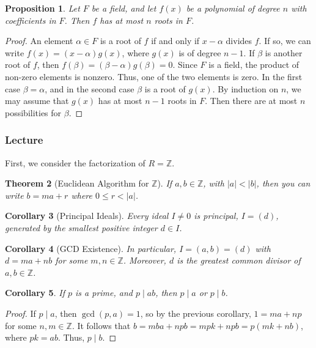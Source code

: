 \documentclass[12pt]{article}
\newtheorem{thm}{Theorem}[section]
\newtheorem{cor}[thm]{Corollary}
\newtheorem{prop}[thm]{Proposition}
\theoremstyle{definition}
\theoremstyle{remark}
\numberwithin{equation}{section}
\newcommand\Z{\mathbb Z}    %
\begin{document}
\begin{prop}
        Let $F$ be a field, and let $f(x)$ be a polynomial of degree $n$ with coefficients in $F$. Then $f$ has at most $n$ roots in $F$.
\end{prop}
\begin{proof}
        An element $\alpha \in F$ is a root of $f$ if and only if $x - \alpha$ divides $f$. If so, we can write $f(x) = (x-\alpha)g(x)$, where $g(x)$ is of degree $n-1$. If $\beta$ is another root of $f$, then $f(\beta) = (\beta - \alpha)g(\beta) = 0$. Since $F$ is a field, the product of non-zero elements is nonzero. Thus, one of the two elements is zero. In the first case $\beta = \alpha$, and in the second case $\beta$ is a root of $g(x)$. By induction on $n$, we may assume that $g(x)$ has at most $n-1$ roots in $F$. Then there are at most $n$ possibilities for $\beta$.
\end{proof}

\vspace{15pt}


\subsubsection{Lecture}

First, we consider the factorization of $R = \Z$.

\begin{thm}[Euclidean Algorithm for $\Z$]
        If $a,b \in \Z$, with $|a| < |b|$, then you can write $b =ma + r$ where $0 \leq r < |a|$.
\end{thm}


\vspace{15pt}

\begin{cor}[Principal Ideals]
        Every ideal $I \neq 0$ is principal, $I = (d)$, generated by the smallest positive integer $d \in I$.
\end{cor}

\vspace{15pt}

\begin{cor}[GCD Existence]
        In particular, $I = (a,b) = (d)$ with $d = ma + nb$ for some $m,n \in \Z$. Moreover, $d$ is the greatest common divisor of $a,b \in \Z$.
\end{cor}

\vspace{15pt}


\begin{cor}
        If $p$ is a prime, and $p\;\vert\;ab$, then $p\;\vert\;a$ or $p\;\vert\;b$.
\end{cor}
\begin{proof}
        If $p\;\vert\;a$, then $\gcd(p,a) = 1$, so by the previous corollary, $1 = ma+np$ for some $n,m \in \Z$. It follows that $b = mba + npb = mpk + npb = p(mk+nb)$, where $pk = ab$. Thus, $p\;\vert\;b$.
\end{proof}
\end{document}
